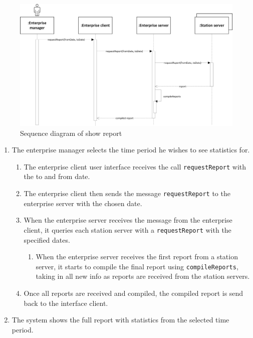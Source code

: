 \documentclass[11pt]{article}
\begin{document}
\begin{figure}[h]
\centering
\includegraphics[width=0.7\linewidth]{../report/img/sequence_diagrams/sequence_diagram_show_reports.png}
\caption[fig1]{Sequence diagram of show report}
\label{fig1}
\end{figure}

\begin{enumerate}
\item The enterprise manager selects the time period he wishes to see statistics for.

\begin{enumerate}
\item The enterprise client user interface receives the call \texttt{requestReport} with the to and from date.
\item The enterprise client then sends the message \texttt{requestReport} to the enterprise server with the chosen date.
\item When the enterprise server receives the message from the enterprise client, it queries each station server with a \texttt{requestReport} with the specified dates.
\begin{enumerate}
\item When the enterprise server receives the first report from a station server, it starts to compile the final report using \texttt{compileReports}, taking in all new info as reports are received from the station servers.
\end{enumerate}
\item Once all reports are received and compiled, the compiled report is send back to the interface client.
\end{enumerate}
\item The system shows the full report with statistics from the selected time period.
\end{enumerate}
\end{document}
